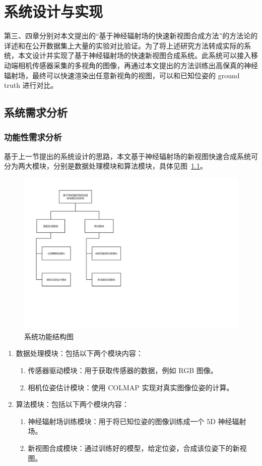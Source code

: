 
\chapter{系统设计与实现}\label{figures_tables}
第三、四章分别对本文提出的“基于神经辐射场的快速新视图合成方法”的方法论的详述和在公开数据集上大量的实验对比验证。为了将上述研究方法转成实际的系统，本文设计并实现了基于神经辐射场的快速新视图合成系统。此系统可以接入移动端相机传感器采集的多视角的图像，再通过本文提出的方法训练出高保真的神经辐射场，最终可以快速渲染出任意新视角的视图，可以和已知位姿的 ground truth 进行对比。

\section{系统需求分析}

\subsection{功能性需求分析}\label{functional}
基于上一节提出的系统设计的思路，本文基于神经辐射场的新视图快速合成系统可分为两大模块，分别是数据处理模块和算法模块，具体见图~\ref{fig:system_struct}。
\begin{figure}[htbp]
    \centering
    \includegraphics[width=0.65\linewidth]{figures/system_struct.pdf}
    \caption{系统功能结构图}
    \label{fig:system_struct}
\end{figure}

\begin{enumerate}
    \item [a)] 数据处理模块：包括以下两个模块内容：
               \begin{enumerate}
                   \item [1)] 传感器驱动模块：用于获取传感器的数据，例如 RGB 图像。
                   \item [2)] 相机位姿估计模块：使用 COLMAP \cite{schonberger2016structure} 实现对真实图像位姿的计算。
               \end{enumerate}
    \item [b)] 算法模块：包括以下两个模块内容：
               \begin{enumerate}
                   \item [1)] 神经辐射场训练模块：用于将已知位姿的图像训练成一个 5D 神经辐射场。
                   \item [2)] 新视图合成模块：通过训练好的模型，给定位姿，合成该位姿下的新视图。
               \end{enumerate}        
\end{enumerate}


